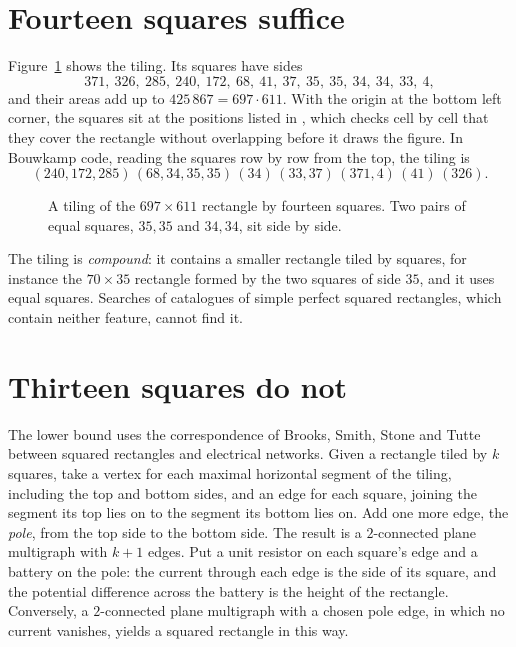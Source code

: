 \documentclass[11pt]{amsart}
\theoremstyle{remark}
\begin{document}
\section{Fourteen squares suffice}

Figure~\ref{fig:tiling} shows the tiling. Its squares have sides
\[
371,\ 326,\ 285,\ 240,\ 172,\ 68,\ 41,\ 37,\ 35,\ 35,\ 34,\ 34,\ 33,\ 4,
\]
and their areas add up to $425\,867=697\cdot611$. With the origin at the bottom left corner, the
squares sit at the positions listed in , which checks cell by cell that they
cover the rectangle without overlapping before it draws the figure. In Bouwkamp code, reading the
squares row by row from the top, the tiling is
\[
(240,172,285)\,(68,34,35,35)\,(34)\,(33,37)\,(371,4)\,(41)\,(326).
\]

\begin{figure}[ht]
\centering

\caption{A tiling of the $697\times611$ rectangle by fourteen squares. Two pairs of equal squares,
$35,35$ and $34,34$, sit side by side.}\label{fig:tiling}
\end{figure}

The tiling is \emph{compound}: it contains a smaller rectangle tiled by squares, for instance the
$70\times35$ rectangle formed by the two squares of side $35$, and it uses equal squares. Searches of
catalogues of simple perfect squared rectangles, which contain neither feature, cannot find it.

\section{Thirteen squares do not}

The lower bound uses the correspondence of Brooks, Smith, Stone and Tutte~\cite{bsst} between squared
rectangles and electrical networks. Given a rectangle tiled by $k$ squares, take a vertex for each
maximal horizontal segment of the tiling, including the top and bottom sides, and an edge for each
square, joining the segment its top lies on to the segment its bottom lies on. Add one more edge, the
\emph{pole}, from the top side to the bottom side. The result is a $2$-connected plane multigraph
with $k+1$ edges. Put a unit resistor on each square's edge and a battery on the pole: the current
through each edge is the side of its square, and the potential difference across the battery is the
height of the rectangle. Conversely, a $2$-connected plane multigraph with a chosen pole edge, in which
no current vanishes, yields a squared rectangle in this way.
\end{document}
